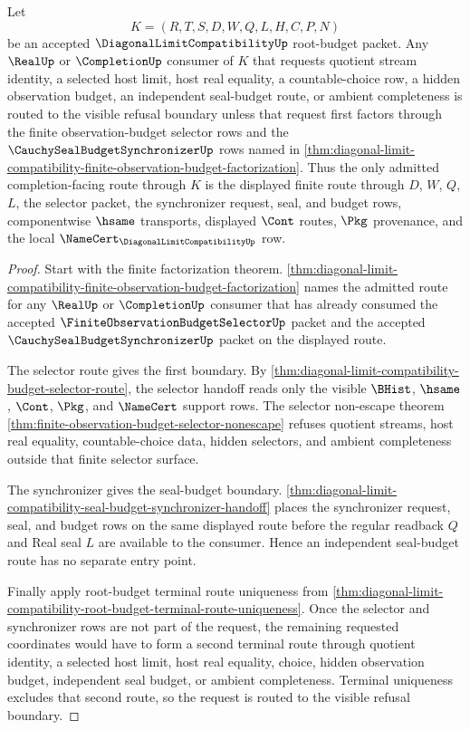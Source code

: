 \begin{theorem}
\label{thm:diagonal-limit-compatibility-finite-observation-budget-refusal-exactness}
Let
$$
K=(R,T,S,D,W,Q,L,H,C,P,N)
$$
be an accepted $\DiagonalLimitCompatibilityUp$ root-budget packet. Any $\RealUp$ or $\CompletionUp$ consumer of $K$ that requests quotient stream identity, a selected host limit, host real equality, a countable-choice row, a hidden observation budget, an independent seal-budget route, or ambient completeness is routed to the visible refusal boundary unless that request first factors through the finite observation-budget selector rows and the $\CauchySealBudgetSynchronizerUp$ rows named in \autoref{thm:diagonal-limit-compatibility-finite-observation-budget-factorization}. Thus the only admitted completion-facing route through $K$ is the displayed finite route through $D$, $W$, $Q$, $L$, the selector packet, the synchronizer request, seal, and budget rows, componentwise $\hsame$ transports, displayed $\Cont$ routes, $\Pkg$ provenance, and the local $\NameCert_{\DiagonalLimitCompatibilityUp}$ row.
\end{theorem}
\begin{proof}
Start with the finite factorization theorem. \autoref{thm:diagonal-limit-compatibility-finite-observation-budget-factorization} names the admitted route for any $\RealUp$ or $\CompletionUp$ consumer that has already consumed the accepted $\FiniteObservationBudgetSelectorUp$ packet and the accepted $\CauchySealBudgetSynchronizerUp$ packet on the displayed route.

The selector route gives the first boundary. By \autoref{thm:diagonal-limit-compatibility-budget-selector-route}, the selector handoff reads only the visible $\BHist$, $\hsame$, $\Cont$, $\Pkg$, and $\NameCert$ support rows. The selector non-escape theorem \autoref{thm:finite-observation-budget-selector-nonescape} refuses quotient streams, host real equality, countable-choice data, hidden selectors, and ambient completeness outside that finite selector surface.

The synchronizer gives the seal-budget boundary. \autoref{thm:diagonal-limit-compatibility-seal-budget-synchronizer-handoff} places the synchronizer request, seal, and budget rows on the same displayed route before the regular readback $Q$ and Real seal $L$ are available to the consumer. Hence an independent seal-budget route has no separate entry point.

Finally apply root-budget terminal route uniqueness from \autoref{thm:diagonal-limit-compatibility-root-budget-terminal-route-uniqueness}. Once the selector and synchronizer rows are not part of the request, the remaining requested coordinates would have to form a second terminal route through quotient identity, a selected host limit, host real equality, choice, hidden observation budget, independent seal budget, or ambient completeness. Terminal uniqueness excludes that second route, so the request is routed to the visible refusal boundary.
\end{proof}

